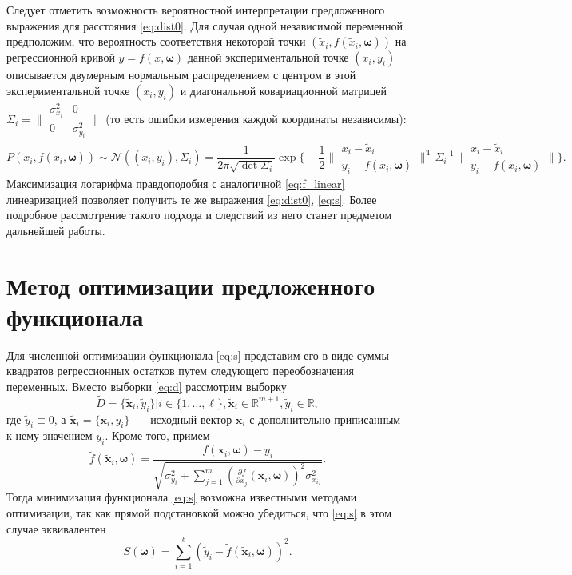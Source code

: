 \documentclass[tikz,10pt,a4paper]{article}
\newcommand{\bomega}{\boldsymbol{\omega}}
\begin{document}
Следует отметить возможность вероятностной интерпретации предложенного
выражения для расстояния \eqref{eq:dist0}.
Для случая одной независимой переменной предположим, что
вероятность соответствия некоторой точки $(\tilde{x}_i, f(\tilde{x}_i, \bomega))$
на регрессионной кривой $y = f(x, \bomega)$
данной экспериментальной точке $(x_i, y_i)$
описывается двумерным нормальным распределением
с центром в этой экспериментальной точке $(x_i, y_i)$
и диагональной ковариационной матрицей
$\Sigma_i = \big\| \begin{smallmatrix} \sigma_{x_i}^2 & 0 \\ 0 & \sigma_{y_i}^2 \end{smallmatrix} \big\|$
(то есть ошибки измерения каждой координаты независимы):
\[
  P(\tilde{x}_i, f(\tilde{x}_i, \bomega)) \sim \mathcal{N}((x_i, y_i), \Sigma_i)
	= \frac{1}{2 \pi \sqrt{\det \Sigma_i}}
			\exp \Big\{ -\frac{1}{2}
						\Big\|\begin{matrix} x_i - \tilde{x}_i \\ y_i - f(\tilde{x}_i, \bomega) \end{matrix}\Big\|^\mathrm{T}
						\Sigma_i^{-1}
						\Big\|\begin{matrix} x_i - \tilde{x}_i \\ y_i - f(\tilde{x}_i, \bomega) \end{matrix}\Big\|
				 \Big\}.
\]
Максимизация логарифма правдоподобия
с аналогичной \eqref{eq:f_linear} линеаризацией
позволяет получить те же выражения \eqref{eq:dist0}, \eqref{eq:s}.
Более подробное рассмотрение такого подхода
и следствий из него станет предметом дальнейшей работы.

\section{Метод оптимизации предложенного функционала}

Для численной оптимизации функционала \eqref{eq:s} представим его в виде
суммы квадратов регрессионных остатков путем следующего переобозначения переменных.
Вместо выборки \eqref{eq:d}
рассмотрим выборку
\[
  \tilde{D} = \{ \tilde{\mathbf{x}}_i, \tilde{y}_i \} | i \in \{ 1, \dots, \ell \}, \tilde{\mathbf{x}}_i \in \mathbb{R}^{m + 1}, \tilde{y}_i \in \mathbb{R},
\]
где $\tilde{y}_i \equiv 0$, а
$\tilde{\mathbf{x}}_i = \{ \mathbf{x}_i, y_i \}$~--- исходный вектор $\mathbf{x}_i$
с дополнительно приписанным к нему значением $y_i$. Кроме того, примем
\[
  \tilde{f}(\tilde{\mathbf{x}}_i, \bomega) = \frac{f(\mathbf{x}_i, \bomega) - y_i}{\sqrt{\sigma_{y_i}^2 + \sum_{j = 1}^m (\frac{\partial f}{\partial x_j}(\mathbf{x}_i, \bomega))^2 \sigma^2_{x_{ij}}}}.
\]
Тогда минимизация функционала \eqref{eq:s} возможна известными методами оптимизации, так
как прямой подстановкой можно убедиться, что \eqref{eq:s} в этом случае эквивалентен
\[
  S(\bomega) = \sum_{i = 1}^\ell (\tilde{y}_i - \tilde{f}(\tilde{\mathbf{x}}_i, \bomega))^2.
\]
\end{document}
